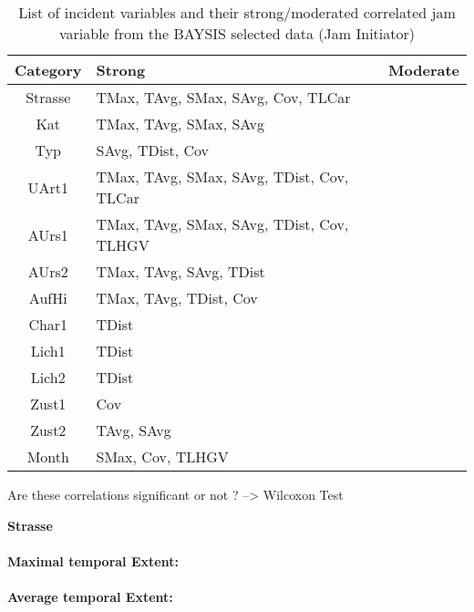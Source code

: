 \noindent
\begin{table}[ht]
	\centering
	\begin{tabular}{c|l|l}  
		\toprule
		\textbf{Category} & \textbf{Strong} & \textbf{Moderate} \\
		\midrule
		Strasse & TMax, TAvg, SMax, SAvg, Cov, TLCar & \\ 
 		Kat & TMax, TAvg, SMax, SAvg & \\ 
 		Typ & SAvg, TDist, Cov & \\
 		UArt1 & TMax, TAvg, SMax, SAvg, TDist, Cov, TLCar & \\
 		AUrs1 & TMax, TAvg, SMax, SAvg, TDist, Cov, TLHGV & \\
 		AUrs2 & TMax, TAvg, SAvg, TDist & \\
 		AufHi & TMax, TAvg, TDist, Cov & \\
 		Char1 & TDist & \\
 		Lich1 & TDist & \\
 		Lich2 & TDist & \\
 		Zust1 & Cov & \\
 		Zust2 & TAvg, SAvg & \\
 		Month & SMax, Cov, TLHGV & \\
 		\bottomrule
	\end{tabular}
	\caption{List of incident variables and their strong/moderated correlated jam variable from the BAYSIS selected data (Jam Initiator)}
\end{table}

Are these correlations significant or not ? --> Wilcoxon Test

\large
\centerline{\textbf{Strasse}}
\normalsize

\paragraph{Maximal temporal Extent:}
\paragraph{Average temporal Extent:}
